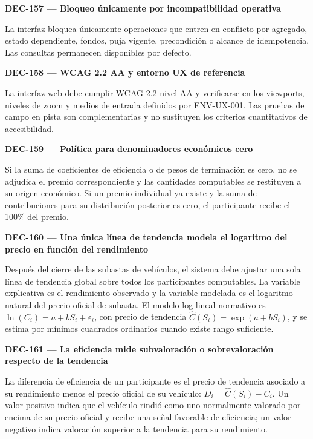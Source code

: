 \documentclass[10pt,letterpaper]{article}
\begin{document}
\noindent\textbf{DEC-157 --- Bloqueo únicamente por incompatibilidad operativa}\par
La interfaz bloquea únicamente operaciones que entren en conflicto por agregado, estado dependiente, fondos, puja vigente, precondición o alcance de idempotencia. Las consultas permanecen disponibles por defecto.\par\vspace{0.45em}
\noindent\textbf{DEC-158 --- WCAG 2.2 AA y entorno UX de referencia}\par
La interfaz web debe cumplir WCAG 2.2 nivel AA y verificarse en los viewports, niveles de zoom y medios de entrada definidos por ENV-UX-001. Las pruebas de campo en pista son complementarias y no sustituyen los criterios cuantitativos de accesibilidad.\par\vspace{0.45em}
\noindent\textbf{DEC-159 --- Política para denominadores económicos cero}\par
Si la suma de coeficientes de eficiencia o de pesos de terminación es cero, no se adjudica el premio correspondiente y las cantidades computables se restituyen a su origen económico. Si un premio individual ya existe y la suma de contribuciones para su distribución posterior es cero, el participante recibe el 100\% del premio.\par
\noindent\textbf{DEC-160 --- Una única línea de tendencia modela el logaritmo del precio en función del rendimiento}\par
Después del cierre de las subastas de vehículos, el sistema debe ajustar una sola línea de tendencia global sobre todos los participantes computables. La variable explicativa es el rendimiento observado y la variable modelada es el logaritmo natural del precio oficial de subasta. El modelo log-lineal normativo es $\ln(C_i)=a+bS_i+\varepsilon_i$, con precio de tendencia $\widehat C(S_i)=\exp(a+bS_i)$, y se estima por mínimos cuadrados ordinarios cuando existe rango suficiente.\par\vspace{0.45em}
\noindent\textbf{DEC-161 --- La eficiencia mide subvaloración o sobrevaloración respecto de la tendencia}\par
La diferencia de eficiencia de un participante es el precio de tendencia asociado a su rendimiento menos el precio oficial de su vehículo: $D_i=\widehat C(S_i)-C_i$. Un valor positivo indica que el vehículo rindió como uno normalmente valorado por encima de su precio oficial y recibe una señal favorable de eficiencia; un valor negativo indica valoración superior a la tendencia para su rendimiento.\par\vspace{0.45em}
\end{document}
